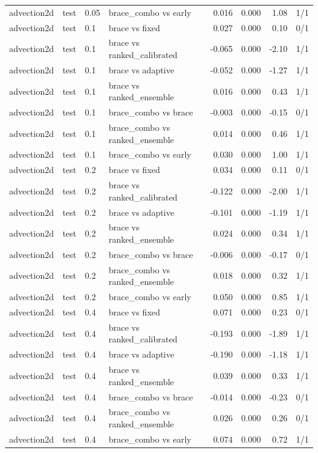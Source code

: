 \begin{tabular}{llllrrrr}
advection2d & test & 0.05 & brace\_combo vs early & 0.016 & 0.000 & 1.08 & 1/1 \\
advection2d & test & 0.1 & brace vs fixed & 0.027 & 0.000 & 0.10 & 0/1 \\
advection2d & test & 0.1 & brace vs ranked\_calibrated & -0.065 & 0.000 & -2.10 & 1/1 \\
advection2d & test & 0.1 & brace vs adaptive & -0.052 & 0.000 & -1.27 & 1/1 \\
advection2d & test & 0.1 & brace vs ranked\_ensemble & 0.016 & 0.000 & 0.43 & 1/1 \\
advection2d & test & 0.1 & brace\_combo vs brace & -0.003 & 0.000 & -0.15 & 0/1 \\
advection2d & test & 0.1 & brace\_combo vs ranked\_ensemble & 0.014 & 0.000 & 0.46 & 1/1 \\
advection2d & test & 0.1 & brace\_combo vs early & 0.030 & 0.000 & 1.00 & 1/1 \\
advection2d & test & 0.2 & brace vs fixed & 0.034 & 0.000 & 0.11 & 0/1 \\
advection2d & test & 0.2 & brace vs ranked\_calibrated & -0.122 & 0.000 & -2.00 & 1/1 \\
advection2d & test & 0.2 & brace vs adaptive & -0.101 & 0.000 & -1.19 & 1/1 \\
advection2d & test & 0.2 & brace vs ranked\_ensemble & 0.024 & 0.000 & 0.34 & 1/1 \\
advection2d & test & 0.2 & brace\_combo vs brace & -0.006 & 0.000 & -0.17 & 0/1 \\
advection2d & test & 0.2 & brace\_combo vs ranked\_ensemble & 0.018 & 0.000 & 0.32 & 1/1 \\
advection2d & test & 0.2 & brace\_combo vs early & 0.050 & 0.000 & 0.85 & 1/1 \\
advection2d & test & 0.4 & brace vs fixed & 0.071 & 0.000 & 0.23 & 0/1 \\
advection2d & test & 0.4 & brace vs ranked\_calibrated & -0.193 & 0.000 & -1.89 & 1/1 \\
advection2d & test & 0.4 & brace vs adaptive & -0.190 & 0.000 & -1.18 & 1/1 \\
advection2d & test & 0.4 & brace vs ranked\_ensemble & 0.039 & 0.000 & 0.33 & 1/1 \\
advection2d & test & 0.4 & brace\_combo vs brace & -0.014 & 0.000 & -0.23 & 0/1 \\
advection2d & test & 0.4 & brace\_combo vs ranked\_ensemble & 0.026 & 0.000 & 0.26 & 0/1 \\
advection2d & test & 0.4 & brace\_combo vs early & 0.074 & 0.000 & 0.72 & 1/1 \\

\end{tabular}
